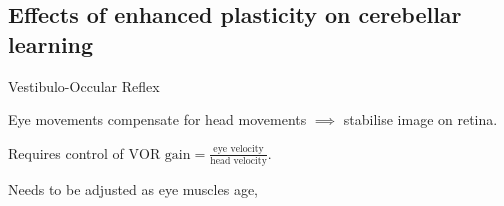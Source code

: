 \documentclass[final]{beamer}%
\begin{document}

\subsection{Effects of enhanced plasticity on cerebellar learning}


\begin{frame}{Vestibulo-Occular Reflex}
%
 \parbox[t]{0.35\linewidth}{}
 \parbox[t]{0.64\linewidth}{%
 Eye movements compensate for head movements $\implies$ stabilise image on retina.

 \vp Requires control of $\text{VOR gain} = \frac{\text{eye velocity}}{\text{head velocity}}$.

 \vp Needs to be adjusted as eye muscles age, \etc
 }

%
\end{frame}


\end{document}
